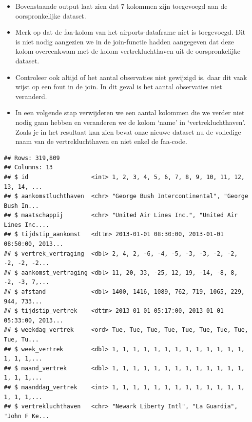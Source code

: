 \documentclass[]{tufte-book}
\newenvironment{Shaded}{}{}
\newcommand{\DataTypeTok}[1]{\textcolor[rgb]{0.56,0.13,0.00}{#1}}
\newcommand{\KeywordTok}[1]{\textcolor[rgb]{0.00,0.44,0.13}{\textbf{#1}}}
\newcommand{\NormalTok}[1]{#1}
\newcommand{\OperatorTok}[1]{\textcolor[rgb]{0.40,0.40,0.40}{#1}}
\newcommand{\StringTok}[1]{\textcolor[rgb]{0.25,0.44,0.63}{#1}}
\providecommand{\tightlist}{%
  \setlength{\itemsep}{0pt}\setlength{\parskip}{0pt}}
\begin{document}
\begin{itemize}
\tightlist
\item
  Bovenstaande output laat zien dat 7 kolommen zijn toegevoegd aan de oorspronkelijke dataset.
\item
  Merk op dat de faa-kolom van het airports-dataframe niet is toegevoegd. Dit is niet nodig aangezien we in de join-functie hadden aangegeven dat deze kolom overeenkwam met de kolom vertrekluchthaven uit de oorspronkelijke dataset.
\item
  Controleer ook altijd of het aantal observaties niet gewijzigd is, daar dit vaak wijst op een fout in de join. In dit geval is het aantal observaties niet veranderd.
\item
  In een volgende stap verwijderen we een aantal kolommen die we verder niet nodig gaan hebben en veranderen we de kolom `name' in `vertrekluchthaven'. Zoals je in het resultaat kan zien bevat onze nieuwe dataset nu de volledige naam van de vertrekluchthaven en niet enkel de faa-code.
\end{itemize}

\begin{Shaded}
\end{Shaded}

\begin{verbatim}
## Rows: 319,809
## Columns: 13
## $ id                  <int> 1, 2, 3, 4, 5, 6, 7, 8, 9, 10, 11, 12, 13, 14, ...
## $ aankomstluchthaven  <chr> "George Bush Intercontinental", "George Bush In...
## $ maatschappij        <chr> "United Air Lines Inc.", "United Air Lines Inc....
## $ tijdstip_aankomst   <dttm> 2013-01-01 08:30:00, 2013-01-01 08:50:00, 2013...
## $ vertrek_vertraging  <dbl> 2, 4, 2, -6, -4, -5, -3, -3, -2, -2, -2, -2, -2...
## $ aankomst_vertraging <dbl> 11, 20, 33, -25, 12, 19, -14, -8, 8, -2, -3, 7,...
## $ afstand             <dbl> 1400, 1416, 1089, 762, 719, 1065, 229, 944, 733...
## $ tijdstip_vertrek    <dttm> 2013-01-01 05:17:00, 2013-01-01 05:33:00, 2013...
## $ weekdag_vertrek     <ord> Tue, Tue, Tue, Tue, Tue, Tue, Tue, Tue, Tue, Tu...
## $ week_vertrek        <dbl> 1, 1, 1, 1, 1, 1, 1, 1, 1, 1, 1, 1, 1, 1, 1, 1,...
## $ maand_vertrek       <dbl> 1, 1, 1, 1, 1, 1, 1, 1, 1, 1, 1, 1, 1, 1, 1, 1,...
## $ maanddag_vertrek    <int> 1, 1, 1, 1, 1, 1, 1, 1, 1, 1, 1, 1, 1, 1, 1, 1,...
## $ vertrekluchthaven   <chr> "Newark Liberty Intl", "La Guardia", "John F Ke...
\end{verbatim}
\end{document}

